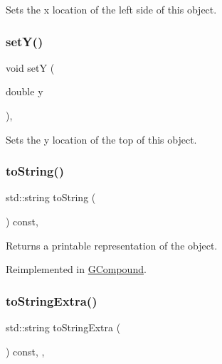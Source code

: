Sets the x location of the left side of this object. 

\mbox{\label{classsgl_1_1GObject_a7d57e2a5c35d27feb58fd498a3cf82b9}} 
\subsubsection{\texorpdfstring{set\+Y()}{setY()}}
{\footnotesize\ttfamily void setY (\begin{DoxyParamCaption}\item[{double}]{y }\end{DoxyParamCaption})\hspace{0.3cm}{\ttfamily [virtual]}, {\ttfamily [inherited]}}



Sets the y location of the top of this object. 

\mbox{\label{classsgl_1_1GObject_a1fe5121d6528fdea3f243321b3fa3a49}} 
\subsubsection{\texorpdfstring{to\+String()}{toString()}}
{\footnotesize\ttfamily std\+::string to\+String (\begin{DoxyParamCaption}{ }\end{DoxyParamCaption}) const\hspace{0.3cm}{\ttfamily [virtual]}, {\ttfamily [inherited]}}



Returns a printable representation of the object. 



Reimplemented in \mbox{\hyperlink{classsgl_1_1GCompound_ab6e28321ea84864a7d677dd35c59523a}{G\+Compound}}.

\mbox{\label{classsgl_1_1GObject_a4fcdf8de5c6de92242a975d83d8f23ea}} 
\subsubsection{\texorpdfstring{to\+String\+Extra()}{toStringExtra()}}
{\footnotesize\ttfamily std\+::string to\+String\+Extra (\begin{DoxyParamCaption}{ }\end{DoxyParamCaption}) const\hspace{0.3cm}{\ttfamily [protected]}, {\ttfamily [virtual]}, {\ttfamily [inherited]}}



